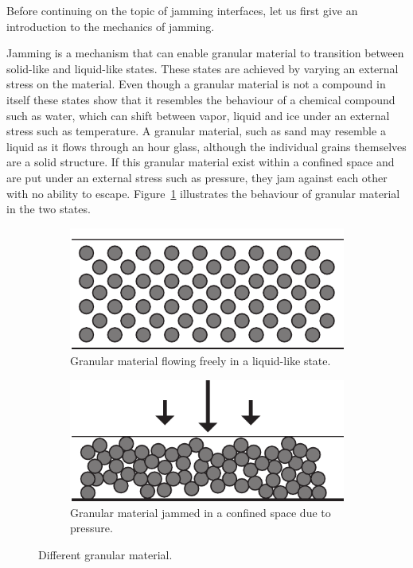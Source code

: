 Before continuing on the topic of jamming interfaces, let us first give an introduction to the mechanics of jamming.

Jamming is a mechanism that can enable granular material to transition between solid-like and liquid-like states. 
These states are achieved by varying an external stress on the material.
Even though a granular material is not a compound in itself these states show that it resembles the behaviour of a chemical compound such as water, which can shift between vapor, liquid and ice under an external stress such as temperature.
A granular material, such as sand may resemble a liquid as it flows through an hour glass, although the individual grains themselves are a solid structure. 
If this granular material exist within a confined space and are put under an external stress such as pressure, they jam against each other with no ability to escape.
Figure~\ref{fig:ch:jamming:particles:jam_unjam} illustrates the behaviour of granular material in the two states.

\begin{figure}[h]
\centering
\begin{subfigure}[b]{.44\textwidth}
  \centering
  \includegraphics[width=\linewidth]{figures/jamming/particles_unjammed.pdf}
  \caption{Granular material flowing freely in a liquid-like state.}
\end{subfigure}%
\hspace{0.02\textwidth}
\begin{subfigure}[b]{.44\textwidth}
  \centering
  \includegraphics[width=\linewidth]{figures/jamming/particles_jammed.pdf}
  \caption{Granular material jammed in a confined space due to pressure.}
\end{subfigure}
\caption{Different granular material.}
\label{fig:ch:jamming:particles:jam_unjam}
\end{figure}

